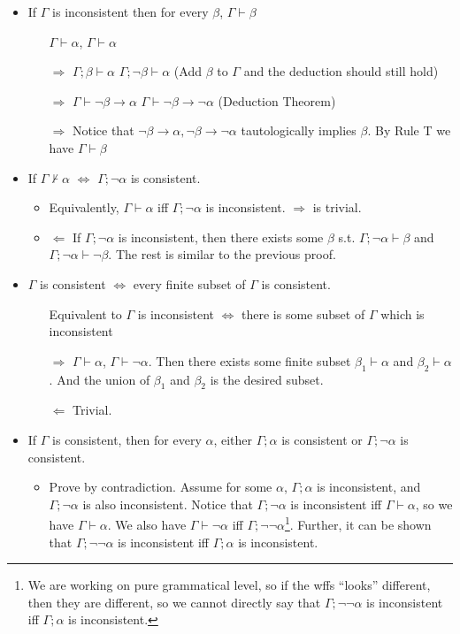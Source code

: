 \begin{itemize}
    \item If $\Gamma$ is inconsistent then for every $\beta$, $\Gamma\vdash\beta$
    \begin{itemize}
        \item[] $\Gamma\vdash\alpha$, $\Gamma\vdash\alpha$
        \item[$\Rightarrow$] $\Gamma;\beta\vdash\alpha$ $\Gamma;\neg\beta\vdash\alpha$ (Add $\beta$ to $\Gamma$ and the deduction should still hold)
        \item[$\Rightarrow$] $\Gamma\vdash\neg\beta\to\alpha$ $\Gamma\vdash\neg\beta\to\neg\alpha$ (Deduction Theorem)
        \item[$\Rightarrow$] Notice that $\neg\beta\to\alpha, \neg\beta\to\neg\alpha$ tautologically implies $\beta$. By Rule T we have $\Gamma\vdash\beta$ 
    \end{itemize}
    \item If $\Gamma\nvdash\alpha$ $\iff$ $\Gamma;\neg\alpha$ is consistent.
    \begin{itemize}
        \item Equivalently, $\Gamma\vdash\alpha$ iff $\Gamma;\neg\alpha$ is inconsistent. $\Rightarrow$ is trivial.
        \item $\Leftarrow$ If $\Gamma;\neg\alpha$ is inconsistent, then there exists some $\beta$ s.t. $\Gamma;\neg\alpha\vdash\beta$ and $\Gamma;\neg\alpha\vdash\neg\beta$. The rest is similar to the previous proof.
    \end{itemize}
    \item $\Gamma$ is consistent $\iff$ every finite subset of $\Gamma$ is consistent.
    \begin{itemize}
        \item[] Equivalent to $\Gamma$ is inconsistent $\iff$ there is some subset of $\Gamma$ which is inconsistent
        \item[$\Rightarrow$] $\Gamma\vdash\alpha$, $\Gamma\vdash\neg\alpha$. Then there exists some finite subset $\beta_1\vdash\alpha$ and $\beta_2\vdash\alpha$. And the union of $\beta_1$ and $\beta_2$ is the desired subset.
        \item[$\Leftarrow$] Trivial. 
    \end{itemize}
    \item If $\Gamma$ is consistent, then for every $\alpha$, either $\Gamma;\alpha$ is consistent or $\Gamma;\neg\alpha$ is consistent.
    \begin{itemize}
        \item Prove by contradiction. Assume for some $\alpha$, $\Gamma;\alpha$ is inconsistent, and $\Gamma;\neg\alpha$ is also inconsistent. Notice that $\Gamma;\neg\alpha$ is inconsistent iff $\Gamma\vdash\alpha$, so we have $\Gamma\vdash\alpha$. We also have $\Gamma\vdash\neg\alpha$ iff $\Gamma;\neg\neg\alpha$\footnote{We are working on pure grammatical level, so if the wffs ``looks'' different, then they are different, so we cannot directly say that $\Gamma;\neg\neg\alpha$ is inconsistent iff $\Gamma;\alpha$ is inconsistent.}. Further, it can be shown that $\Gamma;\neg\neg\alpha$ is inconsistent iff $\Gamma;\alpha$ is inconsistent.

\end{itemize}
\end{itemize}
